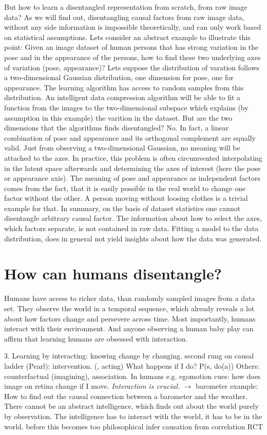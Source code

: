 	But how to learn a disentangled representation from scratch, \ie from raw image data?
	As we will find out, disentangling causal factors from raw image data, without any side information is impossible theoretically, and can only work based on statistical assumptions.
	Lets consider an abstract example to illustrate this point:
	Given an image dataset of human persons that has strong variation in the pose and in the appearance of the persons, how to find these two underlying axes of variation (pose, appearance)? Lets suppose the distribution of varation follows a two-dimensional Gaussian distribution, one dimension for pose, one for appearance. The learning algorithm has access to random samples from this distribution. An intelligent data compression algorithm will be able to fit a function from the images to the two-dimensional subspace which explains (by assumption in this example) the varition in the dataset.
	But are the two dimensions that the algorithms finds disentangled? No. In fact, a linear combination of pose and appearance and its orthogonal complement are equally valid. Just from observing a two-dimensional Gaussian, no meaning will be attached to the axes. In practice, this problem is often circumvented interpolating in the latent space afterwards and determining the axes of interest (here the pose or appearance axis). The meaning of pose and appearance as independent factors comes from the fact, that it is easily possible in the real world to change one factor without the other. A person moving without loosing clothes is a trivial example for that.
	In summary, on the basis of dataset statistics one cannot disentangle arbitrary causal factor. The information about how to select the axes, \ie which factors separate, is not contained in raw data.
	Fitting a model to the data distribution, does in general not yield insights about how the data was generated.

	\section{How can humans disentangle?}
	Humans have access to richer data, than randomly sampled images from a data set. They observe the world in a temporal sequence, which already reveals a lot about how factors change and persevere across time.
	Most importantly, humans interact with their environment. And anyone observing a human baby play can affirm that learning humans are obsessed with interaction.

	3. Learning by interacting: knowing change by changing.
	second rung on causal ladder (Pearl): intervention. (, acting) What happens if I do?
	P(s, do(a))
	Others: counterfactual (imagining), association.
	In humans e.g. egomotion cues: how does image on retina change if I move.
	\textit{Interaction is crucial.} $\rightarrow$ barometer example: How to find out the causal connection between a barometer and the weather.
	There cannot be an abstract intelligence, which finds out about the world purely by observation. The intelligence has to interact with the world, it has to be in the world.
	before this becomes too philosophical
	infer causation from correlation
	RCT


